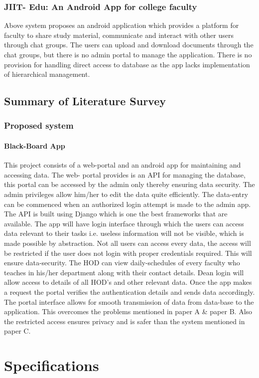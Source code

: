 \documentclass[BTech]{srmuthesis}
\begin{document}
\subsection{JIIT- Edu: An Android App for college faculty}
Above system proposes an android application which provides a platform for faculty to share
study material, communicate and interact with other users through chat groups. The users can
upload and download documents through the chat groups, but there is no admin portal to
manage the application. There is no provision for handling direct access to database as the app
lacks implementation of hierarchical management.
\section{Summary of Literature Survey}
\subsection{Proposed system}
\subsubsection{Black-Board App}
This project consists of a web-portal and an android app for maintaining and accessing data. The web-
portal provides is an API for managing the database, this portal can be accessed by the admin only
thereby ensuring data security. The admin privileges allow him/her to edit the data quite efficiently. The
data-entry can be commenced when an authorized login attempt is made to the admin app. The API is
built using Django which is one the best frameworks that are available. The app will have login interface
through which the users can access data relevant to their tasks i.e. useless information will not be
visible, which is made possible by abstraction. Not all users can access every data, the access will be
restricted if the user does not login with proper credentials required. This will ensure data-security. The
HOD can view daily-schedules of every faculty who teaches in his/her department along with their
contact details. Dean login will allow access to details of all HOD’s and other relevant data. Once the app
makes a request the portal verifies the authentication details and sends data accordingly. The portal
interface allows for smooth transmission of data from data-base to the application. This overcomes the
problems mentioned in paper A \& paper B. Also the restricted access ensures privacy and is safer than
the system mentioned in paper C.
\chapter{Specifications}
\end{document}

